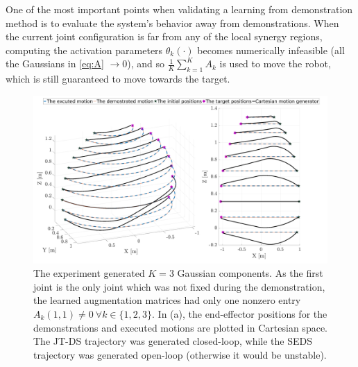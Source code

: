 \documentclass[letterpaper, 10 pt, conference,fleqn]{ieeeconf}
\begin{document}
One of the most important points when validating a learning from demonstration method is to evaluate the system's behavior away from demonstrations.
 When the current joint configuration is far from any of the local synergy regions, computing the activation parameters $\theta_k(\cdot)$ becomes numerically infeasible (all the Gaussians in \eqref{eq:A} $\rightarrow 0$), and so $\frac{1}{K}\sum\limits_{k=1}^{K}A_k$ is used to move the robot, which is still guaranteed to move towards the target. %

\begin{figure}[t]
		\includegraphics[width=\linewidth]{../Pic/cropped_Sing_1.pdf}
	\caption{The experiment generated $K=3$ Gaussian components. As the first joint is the only joint which was not fixed during the demonstration, the learned augmentation matrices had only one nonzero entry $A_k(1,1)\neq0~\forall k\in \{1, 2, 3\} $.  In (a), the end-effector positions for the demonstrations and executed motions are plotted in Cartesian space. The JT-DS trajectory was generated closed-loop, while the SEDS trajectory was generated open-loop (otherwise it would be unstable).} %
			\label{fig:Sin}
	\vspace{-20pt}
\end{figure}
\end{document}
